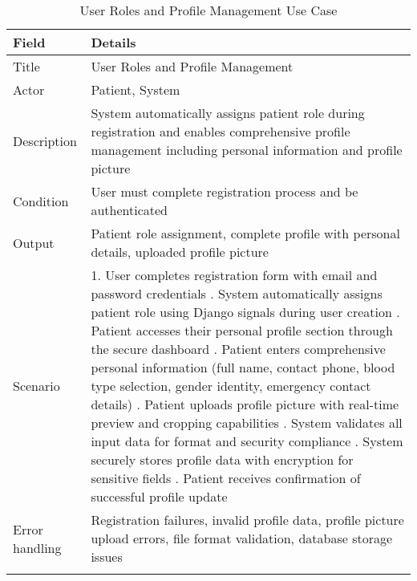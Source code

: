 \begin{longtable}{|p{3cm}|p{12cm}|}
\hline
\textbf{Field} & \textbf{Details} \\
\hline
Title & User Roles and Profile Management \\
\hline
Actor & Patient, System \\
\hline
Description & System automatically assigns patient role during registration and enables comprehensive profile management including personal information and profile picture \\
\hline
Condition & User must complete registration process and be authenticated \\
\hline
Output & Patient role assignment, complete profile with personal details, uploaded profile picture \\
\hline
Scenario & 1. User completes registration form with email and password credentials \newline 2. System automatically assigns patient role using Django signals during user creation \newline 3. Patient accesses their personal profile section through the secure dashboard \newline 4. Patient enters comprehensive personal information (full name, contact phone, blood type selection, gender identity, emergency contact details) \newline 5. Patient uploads profile picture with real-time preview and cropping capabilities \newline 6. System validates all input data for format and security compliance \newline 7. System securely stores profile data with encryption for sensitive fields \newline 8. Patient receives confirmation of successful profile update \\
\hline
Error handling & Registration failures, invalid profile data, profile picture upload errors, file format validation, database storage issues \\
\hline
\caption{User Roles and Profile Management Use Case}
\end{longtable}

